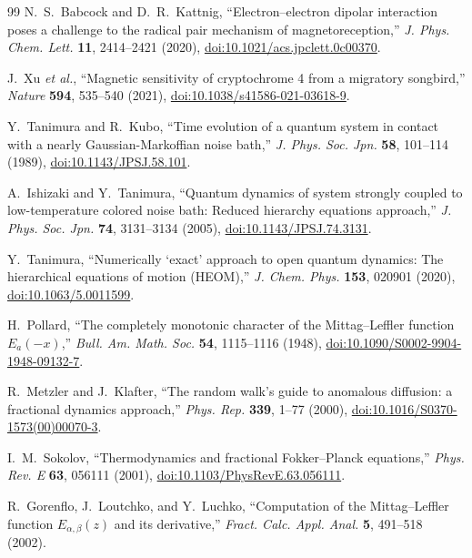 \documentclass[twocolumn,10pt,amsmath,amssymb,floatfix]{revtex4-2}
\theoremstyle{plain}
\theoremstyle{definition}
\begin{document}
{\begin{thebibliography}{99}
N.~S.~Babcock and D.~R.~Kattnig,
``Electron--electron dipolar interaction poses a challenge to the radical pair mechanism of magnetoreception,''
\emph{J. Phys. Chem. Lett.} \textbf{11}, 2414--2421 (2020),
\href{https://doi.org/10.1021/acs.jpclett.0c00370}{doi:10.1021/acs.jpclett.0c00370}.

J.~Xu \emph{et al.},
``Magnetic sensitivity of cryptochrome 4 from a migratory songbird,''
\emph{Nature} \textbf{594}, 535--540 (2021),
\href{https://doi.org/10.1038/s41586-021-03618-9}{doi:10.1038/s41586-021-03618-9}.

Y.~Tanimura and R.~Kubo,
``Time evolution of a quantum system in contact with a nearly Gaussian-Markoffian noise bath,''
\emph{J. Phys. Soc. Jpn.} \textbf{58}, 101--114 (1989),
\href{https://doi.org/10.1143/JPSJ.58.101}{doi:10.1143/JPSJ.58.101}.

A.~Ishizaki and Y.~Tanimura,
``Quantum dynamics of system strongly coupled to low-temperature colored noise bath: Reduced hierarchy equations approach,''
\emph{J. Phys. Soc. Jpn.} \textbf{74}, 3131--3134 (2005),
\href{https://doi.org/10.1143/JPSJ.74.3131}{doi:10.1143/JPSJ.74.3131}.

Y.~Tanimura,
``Numerically `exact' approach to open quantum dynamics: The hierarchical equations of motion (HEOM),''
\emph{J. Chem. Phys.} \textbf{153}, 020901 (2020),
\href{https://doi.org/10.1063/5.0011599}{doi:10.1063/5.0011599}.

H.~Pollard,
``The completely monotonic character of the Mittag--Leffler function $E_a(-x)$,''
\emph{Bull. Am. Math. Soc.} \textbf{54}, 1115--1116 (1948),
\href{https://doi.org/10.1090/S0002-9904-1948-09132-7}{doi:10.1090/S0002-9904-1948-09132-7}.

R.~Metzler and J.~Klafter,
``The random walk's guide to anomalous diffusion: a fractional dynamics approach,''
\emph{Phys. Rep.} \textbf{339}, 1--77 (2000),
\href{https://doi.org/10.1016/S0370-1573(00)00070-3}{doi:10.1016/S0370-1573(00)00070-3}.

I.~M.~Sokolov,
``Thermodynamics and fractional Fokker--Planck equations,''
\emph{Phys. Rev. E} \textbf{63}, 056111 (2001),
\href{https://doi.org/10.1103/PhysRevE.63.056111}{doi:10.1103/PhysRevE.63.056111}.

R.~Gorenflo, J.~Loutchko, and Y.~Luchko,
``Computation of the Mittag--Leffler function $E_{\alpha,\beta}(z)$ and its derivative,''
\emph{Fract. Calc. Appl. Anal.} \textbf{5}, 491--518 (2002).

\end{thebibliography}
}
\end{document}
